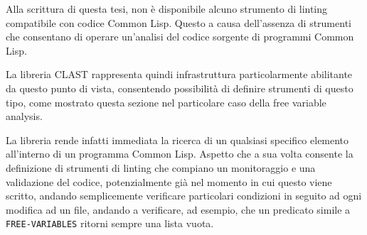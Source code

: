 Alla scrittura di questa tesi, non è disponibile alcuno strumento di linting
compatibile con codice Common Lisp. Questo a causa dell'assenza di strumenti che consentano di operare un'analisi del codice sorgente di programmi Common Lisp.

La libreria CLAST rappresenta quindi infrastruttura particolarmente abilitante
da questo punto di vista, consentendo possibilità di definire strumenti di
questo tipo, come mostrato  questa sezione nel particolare caso della free
variable analysis.

La libreria rende infatti immediata la ricerca di un qualsiasi specifico
elemento all'interno di un programma Common Lisp. Aspetto che a sua volta
consente la definizione di strumenti di linting che compiano un monitoraggio e
una validazione del codice, potenzialmente già nel momento in cui questo viene
scritto, andando semplicemente verificare particolari condizioni in seguito ad
ogni modifica ad un file, andando a verificare, ad esempio, che un predicato
simile a \texttt {FREE-VARIABLES} ritorni sempre una lista vuota.
